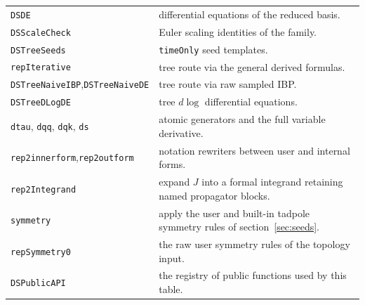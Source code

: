 \documentclass[11pt,a4paper]{article}
\begin{document}
\begin{table}[!ht]
\begin{tabular}{p{4.3cm}p{9.8cm}}
\texttt{DSDE} & differential equations of the reduced basis. \\
\texttt{DSScaleCheck} & Euler scaling identities of the family. \\
\texttt{DSTreeSeeds} & \texttt{timeOnly} seed templates. \\
\texttt{repIterative} & tree route via the general derived formulas. \\
\texttt{DSTreeNaiveIBP},\newline\texttt{DSTreeNaiveDE} & tree route via raw sampled IBP. \\
\texttt{DSTreeDLogDE} & tree $d\log$ differential equations. \\
\texttt{dtau}, \texttt{dqq}, \texttt{dqk}, \texttt{ds} & atomic generators and the full variable derivative. \\
\texttt{rep2innerform},\newline\texttt{rep2outform} & notation rewriters between user and internal forms. \\
\texttt{rep2Integrand} & expand $J$ into a formal integrand retaining named propagator blocks. \\
\texttt{symmetry} & apply the user and built-in tadpole symmetry rules of section~\ref{sec:seeds}. \\
\texttt{repSymmetry0} & the raw user symmetry rules of the topology input. \\
\texttt{DSPublicAPI} & the registry of public functions used by this table. \\
\bottomrule
\end{tabular}
\end{table}

\clearpage


\end{document}
